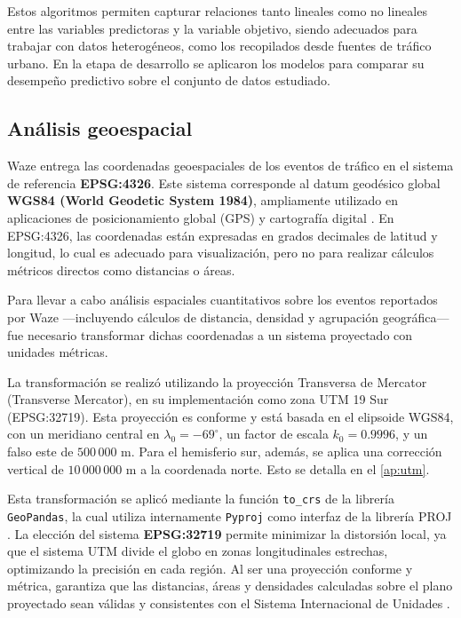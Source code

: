 \documentclass[12pt]{article}
\begin{document}
Estos algoritmos permiten capturar relaciones tanto lineales como no lineales entre las variables predictoras y la variable objetivo, siendo adecuados para trabajar con datos heterogéneos, como los recopilados desde fuentes de tráfico urbano. En la etapa de desarrollo se aplicaron los modelos para comparar su desempeño predictivo sobre el conjunto de datos estudiado.

\subsection{Análisis geoespacial}

Waze entrega las coordenadas geoespaciales de los eventos de tráfico en el sistema de referencia \textbf{EPSG:4326}. Este sistema corresponde al datum geodésico global \textbf{WGS84 (World Geodetic System 1984)}, ampliamente utilizado en aplicaciones de posicionamiento global (GPS) y cartografía digital \parencite{epsg4326, wgs84_nima}. En EPSG:4326, las coordenadas están expresadas en grados decimales de latitud y longitud, lo cual es adecuado para visualización, pero no para realizar cálculos métricos directos como distancias o áreas.

Para llevar a cabo análisis espaciales cuantitativos sobre los eventos reportados por Waze —incluyendo cálculos de distancia, densidad y agrupación geográfica— fue necesario transformar dichas coordenadas a un sistema proyectado con unidades métricas.

La transformación se realizó utilizando la proyección Transversa de Mercator (Transverse Mercator), en su implementación como zona UTM 19 Sur (EPSG:32719). Esta proyección es conforme y está basada en el elipsoide WGS84, con un meridiano central en $\lambda_0 = -69^\circ$, un factor de escala $k_0 = 0.9996$, y un falso este de $500\,000$ m. Para el hemisferio sur, además, se aplica una corrección vertical de $10\,000\,000$ m a la coordenada norte. Esto se detalla en el \autoref{ap:utm}.

Esta transformación se aplicó mediante la función \texttt{to\_crs} de la librería \texttt{GeoPandas}, la cual utiliza internamente \texttt{Pyproj} como interfaz de la librería PROJ \parencite{gdal_proj, pyproj, geopandas}. La elección del sistema \textbf{EPSG:32719} permite minimizar la distorsión local, ya que el sistema UTM divide el globo en zonas longitudinales estrechas, optimizando la precisión en cada región. Al ser una proyección conforme y métrica, garantiza que las distancias, áreas y densidades calculadas sobre el plano proyectado sean válidas y consistentes con el Sistema Internacional de Unidades \parencite{epsg32719}.
\end{document}
